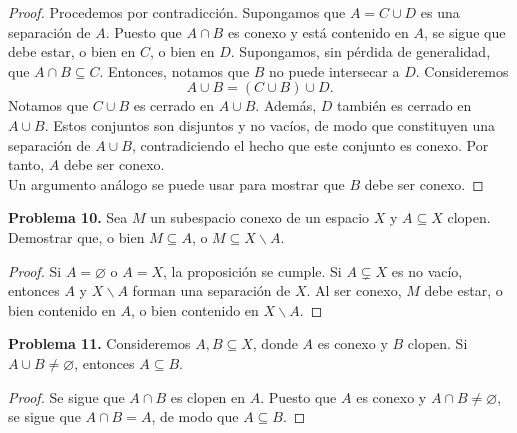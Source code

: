 \documentclass{article}
\begin{document}
\begin{proof}
	Procedemos por contradicción. Supongamos que $A = C \cup D$ es una separación de $A$. Puesto que $A \cap B$ es conexo y está contenido en $A$, se sigue que debe estar, o bien en $C$, o bien en $D$. Supongamos, sin pérdida de generalidad, que $A \cap B \subseteq C$. Entonces, notamos que $B$ no puede intersecar a $D$. Consideremos
	$$ A \cup B = ( C \cup B ) \cup D. $$
	Notamos que $C\cup B$ es cerrado en $A \cup B$. Además, $D$ también es cerrado en $A \cup B$. Estos conjuntos son disjuntos y no vacíos, de modo que constituyen una separación de $A \cup B$, contradiciendo el hecho que este conjunto es conexo. Por tanto, $A$ debe ser conexo. \\
	
	Un argumento análogo se puede usar para mostrar que $B$ debe ser conexo. 
\end{proof}

\begin{mybox}
	\textbf{Problema 10. } Sea $M$ un subespacio conexo de un espacio $X$ y $A \subseteq X$ clopen. Demostrar que, o bien $M \subseteq A$, o $M \subseteq X \backslash A$. 
\end{mybox}	
\begin{proof}
	Si $A = \varnothing$ o $A = X$, la proposición se cumple. Si $A \subsetneq X$ es no vacío, entonces $A$ y $X \backslash A$ forman una separación de $X$. Al ser conexo, $M$ debe estar, o bien contenido en $A$, o bien contenido en $X \backslash A$.  
\end{proof}

\begin{mybox}
	\textbf{Problema 11. } Consideremos $A, B \subseteq X$, donde $A$ es conexo y $B$ clopen. Si $A \cup B \neq \varnothing$, entonces $A \subseteq B$.
\end{mybox}	
\begin{proof}
	Se sigue que $A \cap B$ es clopen en $A$. Puesto que $A$ es conexo y $A \cap B \neq \varnothing$, se sigue que $A \cap B = A$, de modo que $A \subseteq B$.
\end{proof}
\end{document}
